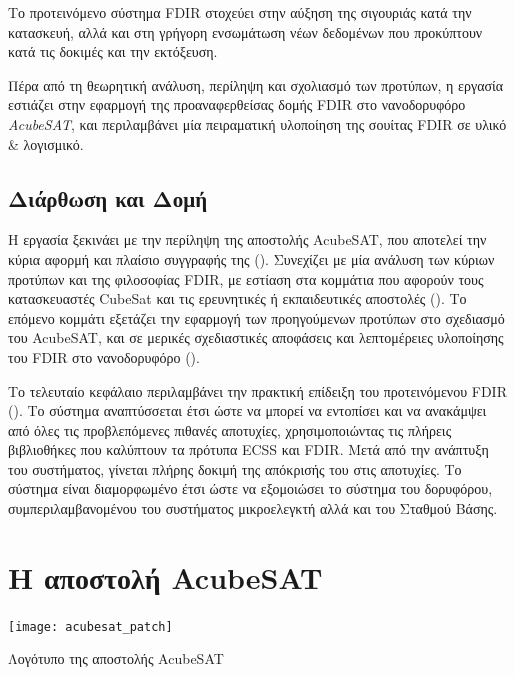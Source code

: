 \documentclass[a4paper,nobib]{tufte-book}
\begin{document}
Το προτεινόμενο σύστημα \acs{FDIR} στοχεύει στην αύξηση της σιγουριάς κατά την κατασκευή, αλλά και στη γρήγορη ενσωμάτωση νέων δεδομένων που προκύπτουν κατά τις δοκιμές και την εκτόξευση.

Πέρα από τη θεωρητική ανάλυση, περίληψη και σχολιασμό των προτύπων, η εργασία εστιάζει στην εφαρμογή της προαναφερθείσας δομής \acs{FDIR} στο νανοδορυφόρο \emph{AcubeSAT}, και περιλαμβάνει μία πειραματική υλοποίηση της σουίτας \acs{FDIR} σε υλικό \& λογισμικό.


\section{Διάρθωση και Δομή}

Η εργασία ξεκινάει με την περίληψη της αποστολής AcubeSAT, που αποτελεί την κύρια αφορμή και πλαίσιο συγγραφής της (). Συνεχίζει με μία ανάλυση των κύριων προτύπων και της φιλοσοφίας \acs{FDIR}, με εστίαση στα κομμάτια που αφορούν τους κατασκευαστές CubeSat και τις ερευνητικές ή εκπαιδευτικές αποστολές (). Το επόμενο κομμάτι εξετάζει την εφαρμογή των προηγούμενων προτύπων στο σχεδιασμό του AcubeSAT, και σε μερικές σχεδιαστικές αποφάσεις και λεπτομέρειες υλοποίησης του \acs{FDIR} στο νανοδορυφόρο ().

Το τελευταίο κεφάλαιο περιλαμβάνει την πρακτική επίδειξη του προτεινόμενου \acs{FDIR}  (). Το σύστημα αναπτύσσεται έτσι ώστε να μπορεί να εντοπίσει και να ανακάμψει από όλες τις προβλεπόμενες πιθανές αποτυχίες, χρησιμοποιώντας τις πλήρεις βιβλιοθήκες που καλύπτουν τα πρότυπα \acs{ECSS} και \acs{FDIR}. Μετά από την ανάπτυξη του συστήματος, γίνεται πλήρης δοκιμή της απόκρισής του στις αποτυχίες. Το σύστημα είναι διαμορφωμένο έτσι ώστε να εξομοιώσει το σύστημα του δορυφόρου, συμπεριλαμβανομένου του συστήματος μικροελεγκτή αλλά και του Σταθμού Βάσης.

\chapter{Η αποστολή AcubeSAT}
\label{cap:acubesat}

\begin{marginfigure}
	\texttt{[image: acubesat\_patch]}
	\caption{Λογότυπο της αποστολής AcubeSAT}
\end{marginfigure}
\end{document}
